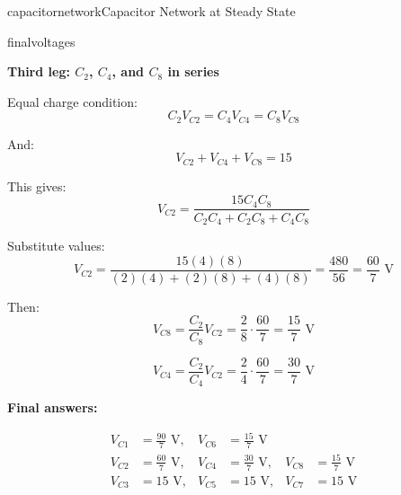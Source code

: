 \begin{mainquestion}{capacitornetwork}{Capacitor Network at Steady State}
\begin{partquestion}{finalvoltages}
\begin{answer}
\medskip
\textbf{Third leg: $C_2$, $C_4$, and $C_8$ in series}

Equal charge condition:
\[
C_2 V_{C2} = C_4 V_{C4} = C_8 V_{C8}
\]

And:
\[
V_{C2} + V_{C4} + V_{C8} = 15
\]

This gives:
\[
V_{C2} = \frac{15 C_4 C_8}{C_2 C_4 + C_2 C_8 + C_4 C_8}
\]

Substitute values:
\[
V_{C2} = \frac{15(4)(8)}{(2)(4) + (2)(8) + (4)(8)}
       = \frac{480}{56}
       = \boxed{\frac{60}{7}\text{ V}}
\]

Then:
\[
V_{C8} = \frac{C_2}{C_8} V_{C2}
       = \frac{2}{8} \cdot \frac{60}{7}
       = \boxed{\frac{15}{7}\text{ V}}
\]

\[
V_{C4} = \frac{C_2}{C_4} V_{C2}
       = \frac{2}{4} \cdot \frac{60}{7}
       = \boxed{\frac{30}{7}\text{ V}}
\]

\medskip
\textbf{Final answers:}

\[
\begin{aligned}
V_{C1} &= \frac{90}{7}\text{ V}, & V_{C6} &= \frac{15}{7}\text{ V} \\
V_{C2} &= \frac{60}{7}\text{ V}, & V_{C4} &= \frac{30}{7}\text{ V}, & V_{C8} &= \frac{15}{7}\text{ V} \\
V_{C3} &= 15\text{ V}, & V_{C5} &= 15\text{ V}, & V_{C7} &= 15\text{ V}
\end{aligned}
\]
\end{answer}

\end{partquestion}

\end{mainquestion}

